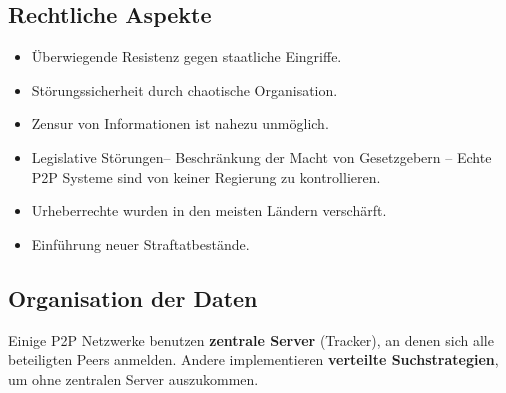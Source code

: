 \documentclass{article} %
\begin{document}
\subsection{Rechtliche Aspekte}
	\begin{itemize}
	\item Überwiegende Resistenz gegen staatliche Eingriffe.
	\item Störungssicherheit durch chaotische Organisation. 
	\item Zensur von Informationen ist nahezu unmöglich. 
	\item Legislative \glqq Störungen\grqq – Beschränkung der Macht von Gesetzgebern – Echte P2P Systeme sind von keiner Regierung zu kontrollieren. 
	\item Urheberrechte wurden in den meisten Ländern verschärft.
	\item Einführung neuer Straftatbestände.
	\end{itemize}
\subsection{Organisation der Daten}
Einige P2P Netzwerke benutzen \textbf{zentrale Server} (Tracker), an denen sich alle beteiligten Peers anmelden. Andere implementieren \textbf{verteilte Suchstrategien}, um ohne zentralen Server auszukommen. 
\end{document}
